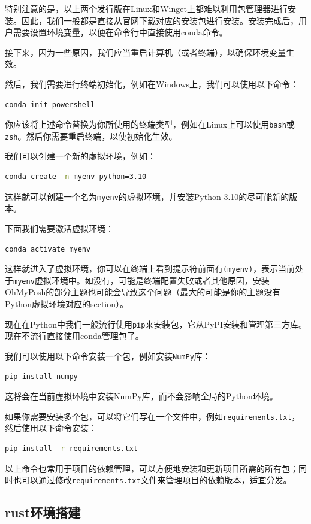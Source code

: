\documentclass[../main.tex]{subfiles}
\begin{document}
特别注意的是，以上两个发行版在Linux和Winget上都难以利用包管理器进行安装。因此，我们一般都是直接从官网下载对应的安装包进行安装。安装完成后，用户需要设置环境变量，以便在命令行中直接使用conda命令。

接下来，因为一些原因，我们应当重启计算机（或者终端），以确保环境变量生效。

然后，我们需要进行终端初始化，例如在Windows上，我们可以使用以下命令：
\begin{lstlisting}[language=bash]
    conda init powershell
\end{lstlisting}

你应该将上述命令替换为你所使用的终端类型，例如在Linux上可以使用\texttt{bash}或\texttt{zsh}。然后你需要重启终端，以使初始化生效。

我们可以创建一个新的虚拟环境，例如：
\begin{lstlisting}[language=bash]
    conda create -n myenv python=3.10
\end{lstlisting}
这样就可以创建一个名为\texttt{myenv}的虚拟环境，并安装Python 3.10的尽可能新的版本。

下面我们需要激活虚拟环境：
\begin{lstlisting}[language=bash]
    conda activate myenv
\end{lstlisting}
这样就进入了虚拟环境，你可以在终端上看到提示符前面有\texttt{(myenv)}，表示当前处于\texttt{myenv}虚拟环境中。如没有，可能是终端配置失败或者其他原因，安装OhMyPosh的部分主题也可能会导致这个问题（最大的可能是你的主题没有Python虚拟环境对应的section）。

现在在Python中我们一般流行使用\texttt{pip}来安装包，它从PyPI安装和管理第三方库。现在不流行直接使用conda管理包了。

我们可以使用以下命令安装一个包，例如安装\texttt{NumPy}库：
\begin{lstlisting}[language=bash]
    pip install numpy
\end{lstlisting}
这将会在当前虚拟环境中安装NumPy库，而不会影响全局的Python环境。

如果你需要安装多个包，可以将它们写在一个文件中，例如\texttt{requirements.txt}，然后使用以下命令安装：
\begin{lstlisting}[language=bash]
    pip install -r requirements.txt
\end{lstlisting}
以上命令也常用于项目的依赖管理，可以方便地安装和更新项目所需的所有包；同时也可以通过修改\texttt{requirements.txt}文件来管理项目的依赖版本，适宜分发。

\subsection{rust环境搭建}
\end{document}
